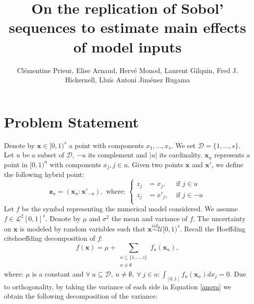 \documentclass[]{elsarticle}
\theoremstyle{definition}
\newcommand{\bvec}[1]{\boldsymbol{#1}}
\newcommand{\vx}{\bvec{x}}
\newcommand{\vz}{\bvec{z}}
\begin{document}
\begin{frontmatter}

\title{On the replication of Sobol' sequences to estimate main effects of model inputs}

\author{Cl\'ementine Prieur, Elise Arnaud, Herv\'{e} Monod, Laurent Gilquin, Fred J. Hickernell, Llu\'{i}s Antoni Jim\'{e}nez Rugama}
\address{University Grenoble Alpes, Illinois Institute of Technology, INRA Jouy-en-Josas}

\end{frontmatter}

\section{Problem Statement}
Denote by $\vx \in [0,1)^s$ a point with components $x_1,\dots,x_s$. We set $\mathcal{D}=\{1,\dots,s\}$. Let $u$ be a subset of $\mathcal{D}$, $-u$ its complement and $|u|$ its cardinality. $\vx_u$ represents a point in $[0,1)^u$ with components $x_j, j \in u$. Given two points $\vx$ and $\vx'$, we define the following hybrid point: 
\[\vz_u=(\vx_u:{\vx'}_{-u}), \text{ where: } \left\{
      \begin{aligned}
        z_j &= x_j, & \text{ if } j \in u\\
        z_j &= {x'}_j, & \text{ if } j \in -u\\
      \end{aligned}
    \right.  \]
Let $f$ be the symbol representing the numerical model considered. We assume $f \in \mathcal{L}^2[0,1]^s$. Denote by $\mu$ and $\sigma^2$ the mean and variance of $f$.
The uncertainty on $\vx$ is modeled by random variables such that $\vx \stackrel{iid}{\sim} \mathcal{U}[0,1)^s$. Recall the Hoeffding cite{hoeffding} decomposition of $f$:
\begin{equation}
f(\vx)=\mu+\sum_{\substack{u \subseteq \{1,\dots,s\} \\ u \neq \emptyset}} f_u(\vx_u),
\label{anova}
\end{equation}
where: $\mu$ is a constant and $\forall \ u \subseteq \mathcal{D}, \ u \neq \emptyset, \ \forall \ j \in u: \int_{[0,1]} f_u(\vx_u) d{x_j}=0$.
Due to orthogonality, by taking the variance of each side in Equation \ref{anova} we obtain the following decomposition of the variance:
\end{document}
